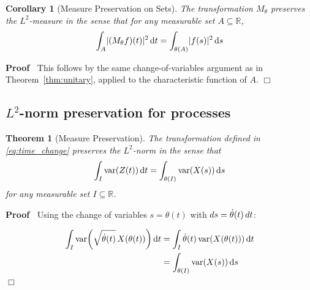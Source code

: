 \documentclass{article}
\newenvironment{proof}{\noindent\textbf{Proof\ }}{\hspace*{\fill}$\Box$\medskip}
\newtheorem{corollary}{Corollary}
\newtheorem{theorem}{Theorem}
\begin{document}
\begin{corollary}[Measure Preservation on Sets]
  \label{cor:measure_preserve}The transformation $M_{\theta}$ preserves the
  $L^2$-measure in the sense that for any measurable set $A \subseteq
  \mathbb{R}$,
  \begin{equation}
    \label{eq:measure_preserve_sets} \int_A \lvert (M_{\theta} f) (t) \rvert^2
    \hspace{0.17em} \mathrm{d} t = \int_{\theta (A)} \lvert f (s) \rvert^2
    \hspace{0.17em} \mathrm{d} s
  \end{equation}
\end{corollary}

\begin{proof}
  This follows by the same change-of-variables argument as in
  Theorem~\ref{thm:unitary}, applied to the characteristic function of $A$.
\end{proof}

\subsection{$L^2$-norm preservation for
processes}\label{sec:norm_preservation}

\begin{theorem}[Measure Preservation]
  \label{thm:measure_preserve}The transformation defined in
  \eqref{eq:time_change} preserves the $L^2$-norm in the sense that
  \begin{equation}
    \label{eq:measure_preserve} \int_I \mathrm{var} (Z (t)) \hspace{0.17em}
    \mathrm{d} t = \int_{\theta (I)} \mathrm{var} (X (s)) \hspace{0.17em}
    \mathrm{d} s
  \end{equation}
  for any measurable set $I \subseteq \mathbb{R}$.
\end{theorem}

\begin{proof}
  Using the change of variables $s = \theta (t)$ with $ds = \dot{\theta} (t) 
  \hspace{0.17em} dt$:
  
  \begin{align}
    \int_I \mathrm{var} \hspace{-0.17em} \left( \sqrt{\dot{\theta} (t)} 
    \hspace{0.17em} X (\theta (t)) \right) \mathrm{d} t & = \int_I
    \dot{\theta} (t) \hspace{0.17em} \mathrm{var} (X (\theta (t)))
    \hspace{0.17em} \mathrm{d} t \\
    & = \int_{\theta (I)} \mathrm{var} (X (s)) \hspace{0.17em} \mathrm{d} s 
  \end{align}
\end{proof}
\end{document}
